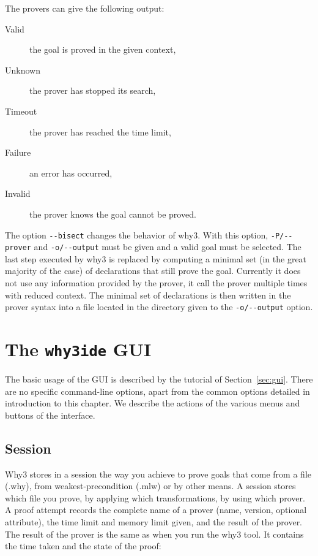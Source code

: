 
\noindent
The provers can give the following output:
\begin{description}
\item[Valid] the goal is proved in the given context,
\item[Unknown] the prover has stopped its search,
\item[Timeout] the prover has reached the time limit,
\item[Failure] an error has occurred,
\item[Invalid] the prover knows the goal cannot be proved.
\end{description}

The option \verb|--bisect| changes the behavior of why3. With this
option, \verb|-P/--prover| and \verb|-o/--output| must be given
and a valid goal must be selected. The last step executed by why3 is
replaced by computing a minimal set (in the great majority of the
case) of declarations that still prove the goal. Currently it does not
use any information provided by the prover, it call the prover
multiple times with reduced context. The minimal set of declarations is
then written in the prover syntax into a file located in the directory
given to the \verb|-o/--output| option.

\section{The \texttt{why3ide} GUI}
\label{sec:ideref}

The basic usage of the GUI is described by the tutorial of
Section~\ref{sec:gui}. There are no specific command-line options,
apart from the common options detailed in introduction to this chapter.
We describe the actions of the various menus and buttons of the
interface.

\subsection{Session}
\label{sec:idref:session}
Why3 stores in a session the way you achieve to prove goals that come
from a file (.why), from weakest-precondition (.mlw) or by other
means. A session stores which file you prove, by applying which
transformations, by using which prover. A proof attempt records the
complete name of a prover (name, version, optional attribute), the
time limit and memory limit given, and the result of the prover. The
result of the prover is the same as when you run the why3 tool. It
contains the time taken and the state of the proof:

